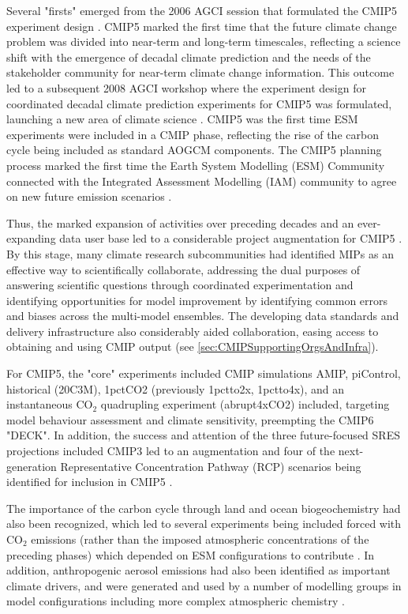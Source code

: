 \documentclass[manuscript]{copernicus}
\begin{document}
Several "firsts" emerged from the 2006 AGCI session that formulated the CMIP5 experiment design \citep{hibbard_strategy_2007}. CMIP5 marked the first time that the future climate change problem was divided into near-term and long-term timescales, reflecting a science shift with the emergence of decadal climate prediction and the needs of the stakeholder community for near-term climate change information. This outcome led to a subsequent 2008 AGCI workshop where the experiment design for coordinated decadal climate prediction experiments for CMIP5 was formulated, launching a new area of climate science \citep{meehl_decadal_2009}. CMIP5 was the first time ESM experiments were included in a CMIP phase, reflecting the rise of the carbon cycle being included as standard AOGCM components. The CMIP5 planning process marked the first time the Earth System Modelling (ESM) Community connected with the Integrated Assessment Modelling (IAM) community to agree on new future emission scenarios \citep{moss_towards_2008}.

Thus, the marked expansion of activities over preceding decades and an ever-expanding data user base led to a considerable project augmentation for CMIP5 \citep{meehl_introduction_2011}. By this stage, many climate research subcommunities had identified MIPs as an effective way to scientifically collaborate, addressing the dual purposes of answering scientific questions through coordinated experimentation and identifying opportunities for model improvement by identifying common errors and biases across the multi-model ensembles. The developing data standards and delivery infrastructure also considerably aided collaboration, easing access to obtaining and using CMIP output (see \autoref{sec:CMIPSupportingOrgsAndInfra}).

For CMIP5, the "core" experiments included CMIP simulations AMIP, piControl, historical (20C3M), 1pctCO2 (previously 1pctto2x, 1pctto4x), and an instantaneous CO$_{2}$ quadrupling experiment (abrupt4xCO2) included, targeting model behaviour assessment and climate sensitivity, preempting the CMIP6 "DECK". In addition, the success and attention of the three future-focused SRES projections included CMIP3 led to an augmentation and four of the next-generation Representative Concentration Pathway (RCP) scenarios being identified for inclusion in CMIP5 \citep{moss_next_2010}.

The importance of the carbon cycle through land and ocean biogeochemistry had also been recognized, which led to several experiments being included forced with CO$_{2}$ emissions (rather than the imposed atmospheric concentrations of the preceding phases) which depended on ESM configurations to contribute \citep{hibbard_strategy_2007,meehl_introduction_2011}. In addition, anthropogenic aerosol emissions had also been identified as important climate drivers, and were generated and used by a number of modelling groups in model configurations including more complex atmospheric chemistry \citep[e.g.,][]{lamarque_historical_2010}.
\end{document}
